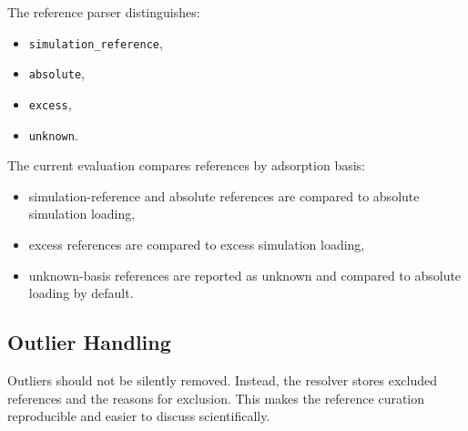 The reference parser distinguishes:

\begin{itemize}
    \item \texttt{simulation\_reference},
    \item \texttt{absolute},
    \item \texttt{excess},
    \item \texttt{unknown}.
\end{itemize}

The current evaluation compares references by adsorption basis:

\begin{itemize}
    \item simulation-reference and absolute references are compared to absolute simulation loading,
    \item excess references are compared to excess simulation loading,
    \item unknown-basis references are reported as unknown and compared to absolute loading by default.
\end{itemize}

\subsection{Outlier Handling}

Outliers should not be silently removed.
Instead, the resolver stores excluded references and the reasons for exclusion.
This makes the reference curation reproducible and easier to discuss scientifically.
